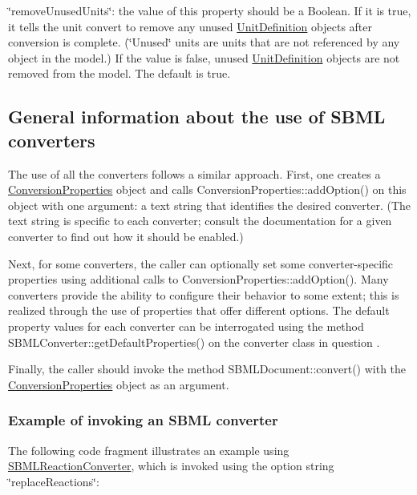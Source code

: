 \begin{DoxyItemize}
\item {\ttfamily \char`\"{}remove\+Unused\+Units\char`\"{}}\+: the value of this property should be a Boolean. If it is {\ttfamily true}, it tells the unit convert to remove any unused \hyperlink{class_unit_definition}{Unit\+Definition} objects after conversion is complete. (\char`\"{}\+Unused\char`\"{} units are units that are not referenced by any object in the model.) If the value is {\ttfamily false}, unused \hyperlink{class_unit_definition}{Unit\+Definition} objects are not removed from the model. The default is {\ttfamily true}.\end{DoxyItemize}
\hypertarget{classdoc__section__using__sbml__converters_using-converters}{}\subsection{General information about the use of S\+B\+M\+L converters}\label{classdoc__section__using__sbml__converters_using-converters}
The use of all the converters follows a similar approach. First, one creates a \hyperlink{class_conversion_properties}{Conversion\+Properties} object and calls Conversion\+Properties\+::add\+Option() on this object with one argument\+: a text string that identifies the desired converter. (The text string is specific to each converter; consult the documentation for a given converter to find out how it should be enabled.)

Next, for some converters, the caller can optionally set some converter-\/specific properties using additional calls to Conversion\+Properties\+::add\+Option(). Many converters provide the ability to configure their behavior to some extent; this is realized through the use of properties that offer different options. The default property values for each converter can be interrogated using the method S\+B\+M\+L\+Converter\+::get\+Default\+Properties() on the converter class in question .

Finally, the caller should invoke the method S\+B\+M\+L\+Document\+::convert() with the \hyperlink{class_conversion_properties}{Conversion\+Properties} object as an argument.\hypertarget{classdoc__section__using__sbml__converters_converter-example}{}\subsubsection{Example of invoking an S\+B\+M\+L converter}\label{classdoc__section__using__sbml__converters_converter-example}
The following code fragment illustrates an example using \hyperlink{class_s_b_m_l_reaction_converter}{S\+B\+M\+L\+Reaction\+Converter}, which is invoked using the option string {\ttfamily \char`\"{}replace\+Reactions\char`\"{}}\+:

